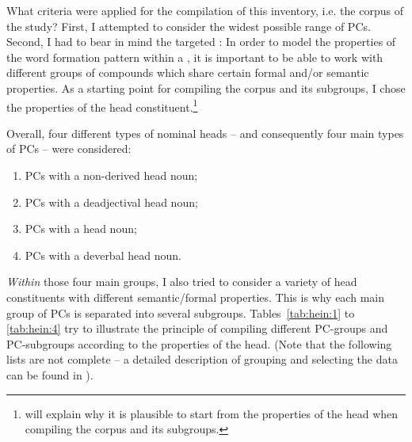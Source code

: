\documentclass[output=paper]{LSP/langsci}
\begin{document}
What criteria were applied for the compilation of this inventory, i.e. the corpus of the study? First, I attempted to consider the widest possible range of PCs.  Second, I had to bear in mind the targeted : In order to model the properties of the word formation pattern within a , it is important to be able to work with different groups of compounds which share certain formal and\slash or semantic properties. As a starting point for compiling the corpus and its subgroups, I chose the properties of the head constituent.\footnote{ will explain why it is plausible to start from the properties of the head when compiling the corpus and its subgroups.} 

Overall, four different types of nominal heads \--- and consequently four main types of PCs -- were considered: 
\begin{enumerate}
\item PCs with a non-derived head noun; 
\item PCs with a deadjectival head noun; 
\item PCs with a  head noun; 
\item PCs with a deverbal head noun. 
\end{enumerate} 
\textit{Within} those four main groups, I also tried to consider a variety of head constituents with different semantic\slash formal properties. This is why each main group of PCs is separated into several subgroups. Tables~\ref{tab:hein:1} to \ref{tab:hein:4} try to illustrate the principle of compiling different PC-groups and PC-subgroups according to the properties of the head. (Note that the following lists are not complete -- a detailed description of grouping and selecting the data can be found in \citealt[Part III]{Hein2015}).
 
\end{document}
